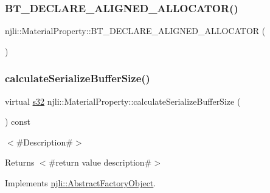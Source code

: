 \subsubsection{\texorpdfstring{B\+T\+\_\+\+D\+E\+C\+L\+A\+R\+E\+\_\+\+A\+L\+I\+G\+N\+E\+D\+\_\+\+A\+L\+L\+O\+C\+A\+T\+O\+R()}{BT\_DECLARE\_ALIGNED\_ALLOCATOR()}}
{\footnotesize\ttfamily njli\+::\+Material\+Property\+::\+B\+T\+\_\+\+D\+E\+C\+L\+A\+R\+E\+\_\+\+A\+L\+I\+G\+N\+E\+D\+\_\+\+A\+L\+L\+O\+C\+A\+T\+OR (\begin{DoxyParamCaption}{ }\end{DoxyParamCaption})\hspace{0.3cm}{\ttfamily [protected]}}

\mbox{\label{classnjli_1_1_material_property_a888f05d2a7c7db1d701aeedc41390943}} 
\subsubsection{\texorpdfstring{calculate\+Serialize\+Buffer\+Size()}{calculateSerializeBufferSize()}}
{\footnotesize\ttfamily virtual \mbox{\hyperlink{_util_8h_aa62c75d314a0d1f37f79c4b73b2292e2}{s32}} njli\+::\+Material\+Property\+::calculate\+Serialize\+Buffer\+Size (\begin{DoxyParamCaption}{ }\end{DoxyParamCaption}) const\hspace{0.3cm}{\ttfamily [virtual]}}

$<$\#\+Description\#$>$

\begin{DoxyReturn}{Returns}
$<$\#return value description\#$>$ 
\end{DoxyReturn}


Implements \mbox{\hyperlink{classnjli_1_1_abstract_factory_object_a4763d05bc9dc37c559111f8bb30e1dd8}{njli\+::\+Abstract\+Factory\+Object}}.

\mbox{\label{classnjli_1_1_material_property_a7cbf31bfe41a2048c0bd26d99f57a74c}} 

